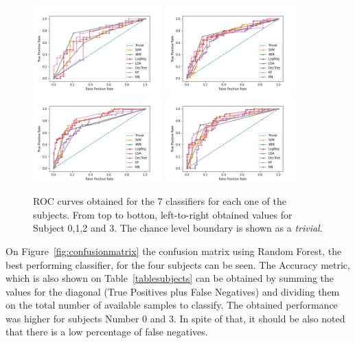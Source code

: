\documentclass[review]{elsarticle}
\begin{document}
\begin{figure}[h!]
\centering
\includegraphics[width=5cm]{images/12_roc.png}
\includegraphics[width=5cm]{images/35_roc.png}\\
\includegraphics[width=5cm]{images/65_roc.png}
\includegraphics[width=5cm]{images/68_roc.png}
\caption[Patch Geometry]{ROC curves obtained for the 7 classifiers for each one of the subjects.  From top to botton, left-to-right obtained values for Subject 0,1,2 and 3.  The chance level boundary is shown as a \textit{trivial}. }
\label{fig:roc}
\end{figure}

 
 On Figure~\ref{fig:confusionmatrix} the confusion matrix using Random Forest, the best performing classifier, for the four subjects can be seen.  The Accuracy metric, which is also shown on Table~\ref{tablesubjects} can be obtained by summing the values for the diagonal (True Positives plus False Negatives) and dividing them on the total number of available samples to classify.  The obtained performance was higher for subjects Number $0$ and $3$.  In spite of that, it should be also noted that there is a low percentage of false negatives. 
\end{document}
